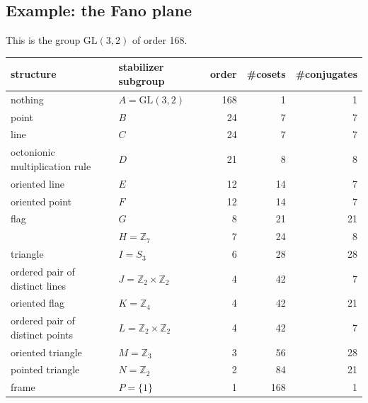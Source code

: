 \documentclass[11pt,oneside]{article}
\newcommand{\Integer}{\mathbb{Z}}
\newcommand{\GL}{\mathrm{GL}}
\begin{document}
%


\subsection{Example: the Fano plane}

This is the group $\GL(3, 2)$ of order 168.



\begin{samepage}
\begin{center}
\begin{tabular}{ |l|l|r|r|r| }
\hline
structure & stabilizer subgroup & order & \#cosets & \#conjugates \\
\hline
\hline
nothing & $A=\GL(3,2)$ &       168        &  1      &   1         \\
\hline
point   & $B$ &       24        &  7      &   7         \\
\hline
line & $C$ &       24        &  7      &   7         \\
\hline
octonionic multiplication rule & $D$ &       21        &  8      &   8         \\
\hline
oriented line & $E$ &       12        &  14      &   7         \\
\hline
oriented point & $F$ &       12        &  14      &   7         \\
\hline
flag & $G$ &       8        &  21      &   21         \\
\hline
        & $H=\Integer_7 $ &       7        &  24      &   8         \\
\hline
triangle & $I=S_3$ &       6        &  28      &   28         \\
\hline
ordered pair of distinct lines & $J=\Integer_2\times\Integer_2$ & 4 &  42 & 7 \\
\hline
oriented flag & $K=\Integer_4$ &       4        &  42      &   21         \\
\hline
ordered pair of distinct points & $L=\Integer_2\times\Integer_2$ &       4        &  42      &   7 \\
\hline
oriented triangle & $M=\Integer_3$ &       3        &  56      &   28         \\
\hline
pointed triangle & $N=\Integer_2$ &       2        &  84      &   21         \\
\hline
frame & $P=\{1\} $ &       1        &  168      &   1         \\
\hline
\end{tabular}
\end{center}
\end{samepage}
\end{document}
